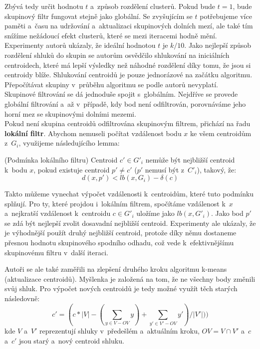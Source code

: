 Zbývá tedy určit hodnotu $t$ a~způsob rozdělení clusterů. Pokud bude $t=1$, bude skupinový filtr fungovat stejně jako globální. Se zvyšujícím se $t$ potřebujeme více paměti a~času na udržování a~aktualizaci skupinových dolních mezí, ale také tím snížíme nežádoucí efekt clusterů, které se mezi iteracemi hodně mění. Experimenty autorů ukázaly, že ideální hodnotou $t$ je $k/10$. Jako nejlepší způsob rozdělení shluků do skupin se autorům osvědčilo shlukování na iniciálních centroidech, které má lepší výsledky než náhodné rozdělení díky tomu, že jsou si centroidy blíže. Shlukování centroidů je pouze jednorázové na začátku algoritmu. Přepočítávat skupiny v~průběhu algoritmu se podle autorů nevyplatí.\\

Skupinové filtrování se dá jednoduše spojit s~globálním. Nejdříve se provede globální filtrování a~až v~případě, kdy bod není odfiltrován, porovnáváme jeho horní mez se skupinovými dolními mezemi.\\

Pokud není skupina centroidů odfiltrována skupinovým filtrem, přichází na řadu \textbf{lokální filtr}. Abychom nemuseli počítat vzdálenost bodu $x$ ke všem centroidům z~$G_i$, využijeme následujícího lemma:
\begin{lemma}
(Podmínka lokálního filtru) Centroid $c' \in G'_i$ nemůže být nejbližší centroid k~bodu $x$, pokud existuje centroid $p' \ne c'$ ($p'$ nemusí být z~$C'_i$), takový, že:
$$d(x,p') < lb(x, G_i)-\delta(c)$$
\end{lemma}
Takto můžeme vynechat výpočet vzdálenosti k~centroidům, které tuto podmínku splňují. Pro ty, které projdou i~lokálním filtrem, spočítáme vzdálenost k~$x$ a~nejkratší vzdálenost k~centroidu $c \in G'_i$ uložíme jako $lb(x,G'_i)$. Jako bod $p'$ se zdá být nejlepší zvolit dosavadní nejbližší centroid. Experimenty ale ukázaly, že je výhodnější použít druhý nejbližší centroid, protože díky němu dostaneme přesnou hodnotu skupinového spodního odhadu, což vede k~efektivnějšímu skupinovému filtru v~další iteraci.

Autoři se ale také zaměřili na zlepšení druhého kroku algoritmu k-means (aktualizace centroidů). Myšlenka je založená na tom, že ne všechny body změnili svůj shluk. Pro výpočet nových centroidů je tedy možné využít těch starých následovně:
$$c' = (c \ast |V| -(\sum\limits_{y\in V-OV}y) + \sum\limits_{y'\in V'-OV}y')/|V'|))$$
kde $V$ a~$V'$ reprezentují shluky v~předešlém a~aktuálním kroku, $OV = V\cap V'$ a~$c$ a~$c'$ jsou starý a~nový centroid shluku.\\

